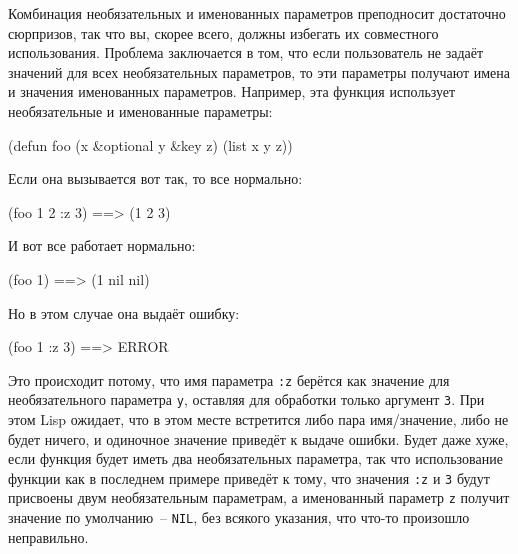 Комбинация необязательных и именованных параметров преподносит достаточно сюрпризов, так
что вы, скорее всего, должны избегать их совместного использования.  Проблема заключается в
том, что если пользователь не задаёт значений для всех необязательных параметров, то эти
параметры получают имена и значения именованных параметров.  Например, эта функция
использует необязательные и именованные параметры:

\begin{myverb}
(defun foo (x &optional y &key z) 
  (list x y z))
\end{myverb}

Если она вызывается вот так, то все нормально:

\begin{myverb}
(foo 1 2 :z 3) ==> (1 2 3)
\end{myverb}

И вот все работает нормально:

\begin{myverb}
(foo 1)  ==> (1 nil nil)
\end{myverb}

Но в этом случае она выдаёт ошибку:

\begin{myverb}
(foo 1 :z 3) ==> ERROR
\end{myverb}

Это происходит потому, что имя параметра \lstinline{:z} берётся как значение для
необязательного параметра \lstinline{y}, оставляя для обработки только аргумент \lstinline{3}.  При
этом Lisp ожидает, что в этом месте встретится либо пара имя/значение, либо не будет
ничего, и одиночное значение приведёт к выдаче ошибки.  Будет даже хуже, если функция
будет иметь два необязательных параметра, так что использование функции как в последнем
примере приведёт к тому, что значения \lstinline{:z} и \lstinline{3} будут присвоены двум
необязательным параметрам, а именованный параметр \lstinline{z} получит значение по
умолчанию~-- \lstinline{NIL}, без всякого указания, что что-то произошло неправильно.

